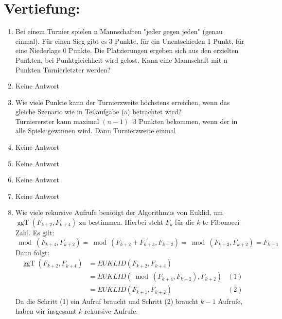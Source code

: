 


\DeclareMathOperator{\ggT}{ggT}
\DeclareMathOperator{\kgV}{kgV}


    \maketitle
    \section*{Vertiefung:}
    \begin{enumerate}[label=(\alph*)]
        \item Bei einem Turnier spielen n Mannschaften "jeder gegen jeden" (genau einmal). Für einen
		Sieg gibt es 3 Punkte, für ein Unentschieden 1 Punkt, für eine Niederlage 0 Punkte. Die
		Platzierungen ergeben sich aus den erzielten Punkten, bei Punktgleichheit wird gelost.
		Kann eine Mannschaft mit n Punkten Turnierletzter werden?
		
        \item Keine Antwort
        
        \item Wie viele Punkte kann der Turnierzweite höchstens erreichen, wenn das gleiche Szenario
		wie in Teilaufgabe (a) betrachtet wird?\\
		Turniererster kann maximal $(n-1)\cdot 3$ Punkten bekommen, wenn der in alle Spiele gewinnen 
		wird. Dann Turnierzweite einmal 
        
        \item Keine Antwort
        
        \item Keine Antwort
        
        \item Keine Antwort
        
        \item Keine Antwort
        
        \item Wie viele rekursive Aufrufe benötigt der Algorithmus von Euklid, um $\ggT(F_{k+2},F_{k+4})$
		zu bestimmen. Hierbei steht $F_k$ für die $k$-te Fibonacci-Zahl.
		Es gilt:
		\[\bmod(F_{k+4},F_{k+2}) = \bmod(F_{k+2} + F_{k+3},F_{k+2}) = \bmod(F_{k+3},F_{k+2}) = F_{k+1}\]
		Dann folgt:
		\begin{align*}
			\ggT(F_{k+2},F_{k+4}) &= EUKLID(F_{k+2},F_{k+4}) \\
			 &= EUKLID(\bmod(F_{k+4},F_{k+2}),F_{k+2}) &(1) \\ 
			 &= EUKLID(F_{k+1},F_{k+2}) &(2)
		\end{align*}
		Da die Schritt (1) ein Aufruf braucht und Schritt (2) braucht $k-1$ Aufrufe, haben wir insgesamt
		$k$ rekursive Aufrufe.

    \end{enumerate}
